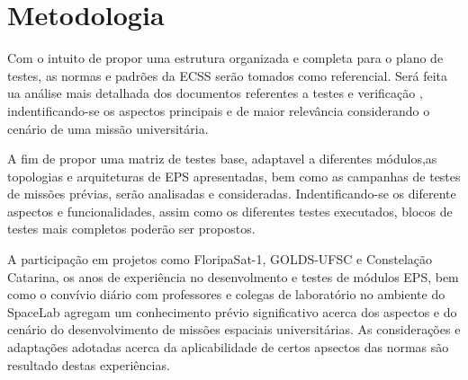 \chapter{Metodologia}

Com o intuito de propor uma estrutura organizada e completa para o plano de testes, as normas e padrões da \gls{ECSS} serão tomados como referencial.
Será feita ua análise mais detalhada dos documentos referentes a testes \cite{ecss-e-st-10-03} e verificação \cite{ecss-e-st-10-02}, indentificando-se os aspectos principais e de maior relevância considerando o cenário de uma missão universitária.

A fim de propor uma matriz de testes base, adaptavel a diferentes módulos,as topologias e arquiteturas de \gls{EPS} apresentadas, bem como as campanhas de testes de missões prévias, serão analisadas e consideradas. Indentificando-se os diferente aspectos e funcionalidades, assim como os diferentes testes executados, blocos de testes mais completos poderão ser propostos.

A participação em projetos como FloripaSat-1, GOLDS-UFSC e Constelação Catarina, os anos de experiência no desenvolmento e testes de módulos \gls{EPS}, bem como o convívio diário com professores e colegas de laboratório no ambiente do SpaceLab agregam um conhecimento prévio significativo acerca dos aspectos e do cenário do desenvolvimento de missões espaciais universitárias.
As considerações e adaptações adotadas acerca da aplicabilidade de certos apsectos das normas são resultado destas experiências.